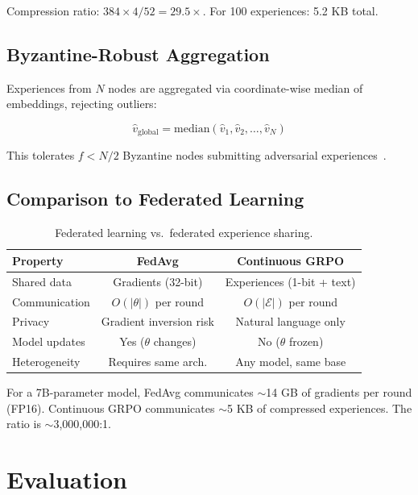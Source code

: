 \documentclass[11pt,letterpaper]{article}
\begin{document}
Compression ratio: $384 \times 4 / 52 = 29.5\times$.  For 100 experiences: 5.2 KB total.

\subsection{Byzantine-Robust Aggregation}

Experiences from $N$ nodes are aggregated via coordinate-wise median of embeddings, rejecting outliers:

\begin{equation}
    \hat{v}_{\text{global}} = \text{median}\!\left(\hat{v}_1, \hat{v}_2, \ldots, \hat{v}_N\right)
\end{equation}

This tolerates $f < N/2$ Byzantine nodes submitting adversarial experiences~\cite{yin2018byzantine}.

\subsection{Comparison to Federated Learning}

\begin{table}[t]
\centering
\begin{tabular}{lcc}
\toprule
\textbf{Property} & \textbf{FedAvg} & \textbf{Continuous GRPO} \\
\midrule
Shared data & Gradients (32-bit) & Experiences (1-bit + text) \\
Communication & $O(|\theta|)$ per round & $O(|\mathcal{E}|)$ per round \\
Privacy & Gradient inversion risk & Natural language only \\
Model updates & Yes ($\theta$ changes) & No ($\theta$ frozen) \\
Heterogeneity & Requires same arch. & Any model, same base \\
\bottomrule
\end{tabular}
\caption{Federated learning vs.\ federated experience sharing.}
\label{tab:federated}
\end{table}

For a 7B-parameter model, FedAvg communicates $\sim$14 GB of gradients per round (FP16).  Continuous GRPO communicates $\sim$5 KB of compressed experiences.  The ratio is $\sim$3{,}000{,}000:1.

\section{Evaluation}
\label{sec:evaluation}
\end{document}

